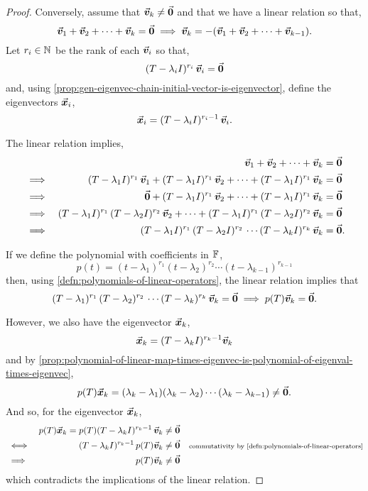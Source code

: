 \documentclass[../MathsNotesBase.tex]{subfiles}
\begin{document}
{\begin{proof}
			\nl[3]
			Conversely, assume that ${ \vec{\bm{v}}_k \neq \vec{\bm{0}} }$ and that we have a linear relation so that,
			\[ \vec{\bm{v}}_1 + \vec{\bm{v}}_2 + \cdots + \vec{\bm{v}}_k = \vec{\bm{0}} \implies \vec{\bm{v}}_k = -(\vec{\bm{v}}_1 + \vec{\bm{v}}_2 + \cdots + \vec{\bm{v}}_{k-1}). \]
			Let ${ r_i \in \mathbb{N}^{} }$ be the rank of each $\vec{\bm{v}}_i$ so that,
			\[ (T - \lambda_i I)^{r_i} \, \vec{\bm{v}}_i = \vec{\bm{0}} \]
			and, using \autoref{prop:gen-eigenvec-chain-initial-vector-is-eigenvector}, define the eigenvectors $\vec{\bm{x}}_i$,
			\[ \vec{\bm{x}}_i = (T - \lambda_i I)^{r_i - 1} \, \vec{\bm{v}}_i. \]

			The linear relation implies,
			\[\begin{aligned}
				&& \vec{\bm{v}}_1 + \vec{\bm{v}}_2 + \cdots + \vec{\bm{v}}_k &= \vec{\bm{0}} \\
				&\implies & (T - \lambda_1 I)^{r_1} \, \vec{\bm{v}}_1 + (T - \lambda_1 I)^{r_1} \, \vec{\bm{v}}_2 + \cdots + (T - \lambda_1 I)^{r_1} \, \vec{\bm{v}}_k &= \vec{\bm{0}} \\
				&\implies & \vec{\bm{0}} + (T - \lambda_1 I)^{r_1} \, \vec{\bm{v}}_2 + \cdots + (T - \lambda_1 I)^{r_1} \, \vec{\bm{v}}_k &= \vec{\bm{0}} \\
				&\implies & (T - \lambda_1 I)^{r_1} \, (T - \lambda_2 I)^{r_2} \, \vec{\bm{v}}_2 + \cdots + (T - \lambda_1 I)^{r_1} \, (T - \lambda_2 I)^{r_2} \, \vec{\bm{v}}_k &= \vec{\bm{0}} \\
				&\implies & (T - \lambda_1 I)^{r_1} \, (T - \lambda_2 I)^{r_2} \, \cdots (T - \lambda_k I)^{r_k} \, \vec{\bm{v}}_k &= \vec{\bm{0}}. \\
			\end{aligned}\]
		
			If we define the polynomial with coefficients in $\mathbb{F}^{}$,
			\[ p(t) = (t - \lambda_1)^{r_1}(t - \lambda_2)^{r_2}\cdots(t - \lambda_{k-1})^{r_{k-1}} \]
			then, using \ref{defn:polynomials-of-linear-operators}, the linear relation implies that
			\[ (T - \lambda_1)^{r_1} \, (T - \lambda_2)^{r_2} \, \cdots (T - \lambda_k)^{r_k} \, \vec{\bm{v}}_k = \vec{\bm{0}} \implies p(T)\vec{\bm{v}}_k = \vec{\bm{0}}. \]
			
			However, we also have the eigenvector $\vec{\bm{x}}_k$,
			\[ \vec{\bm{x}}_k = (T - \lambda_k I)^{r_k - 1} \vec{\bm{v}}_k \]
			and by \autoref{prop:polynomial-of-linear-map-times-eigenvec-is-polynomial-of-eigenval-times-eigenvec}, 
			\[ p(T)\vec{\bm{x}}_k = (\lambda_k - \lambda_1)(\lambda_k - \lambda_2)\cdots(\lambda_k - \lambda_{k-1}) \neq \vec{\bm{0}}. \]
			And so, for the eigenvector $\vec{\bm{x}}_k$,
			\[\begin{aligned}
				&& p(T)\vec{\bm{x}}_k = p(T)(T - \lambda_k I)^{r_k - 1} \, \vec{\bm{v}}_k &\neq \vec{\bm{0}} \\
				&\iff & (T - \lambda_k I)^{r_k - 1} \, p(T)\vec{\bm{v}}_k &\neq \vec{\bm{0}} &\text{\scriptsize{commutativity by \ref{defn:polynomials-of-linear-operators}}} \\
				&\implies & p(T)\vec{\bm{v}}_k &\neq \vec{\bm{0}} \\
			\end{aligned}\]
			which contradicts the implications of the linear relation.
		\end{proof}
	
}
\end{document}
